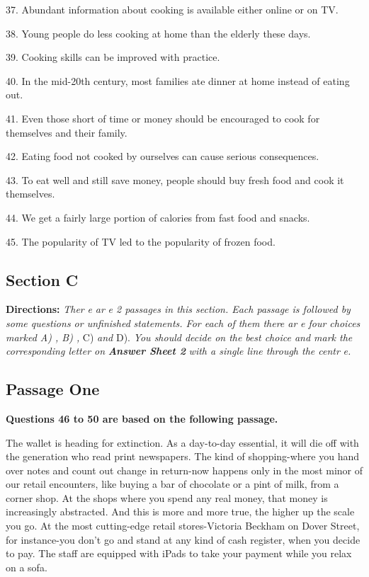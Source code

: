 \documentclass[UTF8,11pt]{ctexart}
\begin{document}
37. Abundant information about cooking is available either online or on TV.


38. Young people do less cooking at home than the elderly these days.


39. Cooking skills can be improved with practice.


40. In the mid-20th century, most families ate dinner at home instead of eating out.


41. Even those short of time or money should be encouraged to cook for themselves and their family.


42. Eating food not cooked by ourselves can cause serious consequences.


43. To eat well and still save money, people should buy fresh food and cook it themselves.


44. We get a fairly large portion of calories from fast food and snacks.


45. The popularity of TV led to the popularity of frozen food.


\subsection*{\textbf{Section C}}


\textbf{Directions: }\textit{Ther} \textit{e ar} \textit{e 2 passages in this section. Each passage is followed by some questions or unfinished} \textit{statements. For each of them there ar} \textit{e four choices marked A) , B) , }C) \textit{and }D). \textit{You should decide on the} \textit{best choice and mark the corresponding letter on }\textbf{\textit{Answer Sheet 2 }}\textit{with a single line through the centr} \textit{e.}


\subsection*{\textbf{Passage One}}


\textbf{Questions 46 to 50 are based on the following passage.}


The wallet is heading for extinction. As a day-to-day essential, it will die off with the generation who read print newspapers. The kind of shopping-where you hand over notes and count out change in return-now happens only in the most minor of our retail encounters, like buying a bar of chocolate or a pint of milk, from a corner shop. At the shops where you spend any real money, that money is increasingly abstracted. And this is more and more true, the higher up the scale you go. At the most cutting-edge retail stores-Victoria Beckham on Dover Street, for instance-you don't go and stand at any kind of cash register, when you decide to pay. The staff are equipped with iPads to take your payment while you relax on a sofa.
\end{document}
